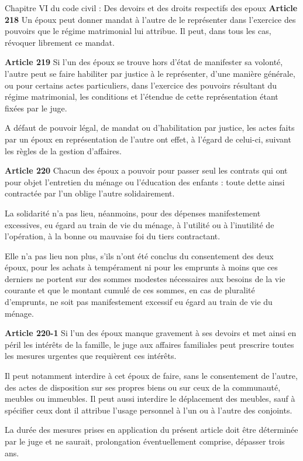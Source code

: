 \documentclass[
  12pt,
]{book}
\begin{document}
\begin{encadre}{Chapitre VI du code civil : Des devoirs et des droits respectifs des epoux}
\textbf{Article 218}
Un époux peut donner mandat à l'autre de le représenter dans l'exercice des pouvoirs que le régime matrimonial lui attribue. Il peut, dans tous les cas, révoquer librement ce mandat.

\textbf{Article 219}
Si l'un des époux se trouve hors d'état de manifester sa volonté, l'autre peut se faire habiliter par justice à le représenter, d'une manière générale, ou pour certains actes particuliers, dans l'exercice des pouvoirs résultant du régime matrimonial, les conditions et l'étendue de cette représentation étant fixées par le juge.

A défaut de pouvoir légal, de mandat ou d'habilitation par justice, les actes faits par un époux en représentation de l'autre ont effet, à l'égard de celui-ci, suivant les règles de la gestion d'affaires.

\textbf{Article 220}
Chacun des époux a pouvoir pour passer seul les contrats qui ont pour objet l'entretien du ménage ou l'éducation des enfants : toute dette ainsi contractée par l'un oblige l'autre solidairement.

La solidarité n'a pas lieu, néanmoins, pour des dépenses manifestement excessives, eu égard au train de vie du ménage, à l'utilité ou à l'inutilité de l'opération, à la bonne ou mauvaise foi du tiers contractant.

Elle n'a pas lieu non plus, s'ils n'ont été conclus du consentement des deux époux, pour les achats à tempérament ni pour les emprunts à moins que ces derniers ne portent sur des sommes modestes nécessaires aux besoins de la vie courante et que le montant cumulé de ces sommes, en cas de pluralité d'emprunts, ne soit pas manifestement excessif eu égard au train de vie du ménage.

\textbf{Article 220-1}
Si l'un des époux manque gravement à ses devoirs et met ainsi en péril les intérêts de la famille, le juge aux affaires familiales peut prescrire toutes les mesures urgentes que requièrent ces intérêts.

Il peut notamment interdire à cet époux de faire, sans le consentement de l'autre, des actes de disposition sur ses propres biens ou sur ceux de la communauté, meubles ou immeubles. Il peut aussi interdire le déplacement des meubles, sauf à spécifier ceux dont il attribue l'usage personnel à l'un ou à l'autre des conjoints.

La durée des mesures prises en application du présent article doit être déterminée par le juge et ne saurait, prolongation éventuellement comprise, dépasser trois ans.


\end{encadre}
\end{document}
